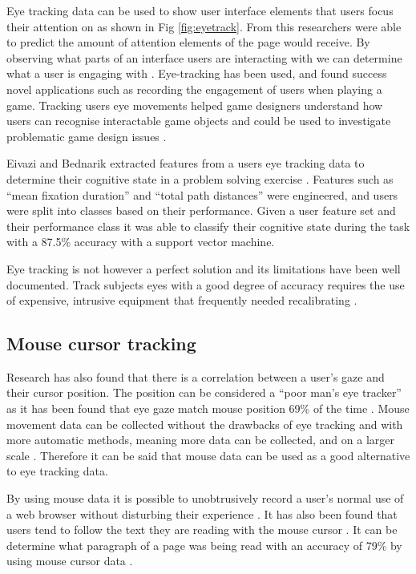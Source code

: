 \documentclass{article}
\begin{document}
Eye tracking data can be used to show user interface elements that users focus their attention on as shown in Fig \ref{fig:eyetrack}. 
From this researchers were able to predict the amount of attention elements of the page would receive.
By observing what parts of an interface users are interacting with we can determine what a user is engaging with \cite{buscher2009you}.
Eye-tracking has been used, and found success novel applications such as recording the engagement of users when playing a game. 
Tracking users eye movements helped game designers understand how users can recognise interactable game objects and could be used to investigate problematic game design issues \cite{renshaw2009towards}.

Eivazi and Bednarik extracted features from a users eye tracking data to determine their cognitive state in a problem solving exercise \cite{eivazi2011predicting}.
Features such as ``mean fixation duration'' and ``total path distances'' were engineered, and users were split into classes based on their performance. 
Given a user feature set and their performance class it was able to classify their cognitive state during the task with a 87.5\% accuracy with a support vector machine.

Eye tracking is not however a perfect solution and its limitations have been well documented. 
Track subjects eyes with a good degree of accuracy requires the use of expensive, intrusive equipment that frequently needed recalibrating \cite{richardson2004eye}. 


\subsection{Mouse cursor tracking}

Research has also found that there is a correlation between a user’s gaze and their cursor position. 
The position can be considered a ``poor man’s eye tracker'' as it has been found that eye gaze match mouse position 69\% of the time \cite{cooke2006mouse}. 
Mouse movement data can be collected without the drawbacks of eye tracking and with more automatic methods, meaning more data can be collected, and on a larger scale \cite{demvsar2017quantifying}.
Therefore it can be said that mouse data can be used as a good alternative to eye tracking data.

By using mouse data it is possible to unobtrusively record a user’s normal use of a web browser without disturbing their experience \cite{goecks2000learning}.
It has also been found that users tend to follow the text they are reading with the mouse cursor \cite{liu2007detecting}. 
It can be determine what paragraph of a page was being read with an accuracy of 79\% by using mouse cursor data \cite{hauger2011using}. 
\end{document}
